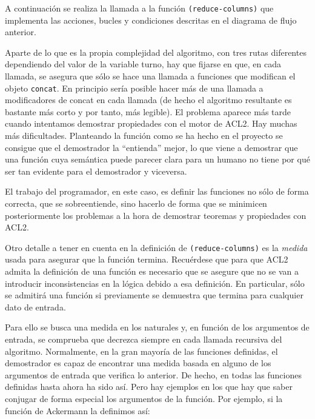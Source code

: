 \documentclass[a4paper,10pt]{article}
\begin{document}
\par \vspace{10pt}

A continuación se realiza la llamada a la función \texttt{(reduce-columns)} que implementa las acciones, bucles y condiciones descritas en el diagrama de flujo anterior. 

\par \vspace{10pt}

Aparte de lo que es la propia complejidad del algoritmo, con tres rutas diferentes dependiendo del valor de la variable turno, hay que fijarse en que, en cada llamada, se asegura que sólo se hace una llamada a funciones que modifican el objeto \texttt{concat}. En principio sería posible hacer más de una llamada a modificadores de concat en cada llamada (de hecho el algoritmo resultante es bastante más corto y por tanto, más legible). El problema aparece más tarde cuando intentamos demostrar propiedades con el motor de ACL2. Hay muchas más dificultades. Planteando la función como se ha hecho en el proyecto se consigue que el demostrador la ``entienda'' mejor, lo que viene a demostrar que una función cuya semántica puede parecer clara para un humano no tiene por qué ser tan evidente para el demostrador y viceversa. 

\par \vspace{10pt}

El trabajo del programador, en este caso, es definir las funciones no sólo de forma correcta, que se sobreentiende, sino hacerlo de forma que se minimicen posteriormente los problemas a la hora de demostrar teoremas y propiedades con ACL2.

\par \vspace{10pt}

Otro detalle a tener en cuenta en la definición de \texttt{(reduce-columns)} es la \emph{medida} usada para asegurar que la función termina. Recuérdese que para que ACL2 admita la definición de una función es necesario que se asegure que no se van a introducir inconsistencias en la lógica debido a esa definición. En particular, sólo se admitirá una función si previamente se demuestra que termina para cualquier dato de entrada.

\par \vspace{10pt}

Para ello se busca una medida en los naturales y, en función de los argumentos de entrada, se comprueba que decrezca siempre en cada llamada recursiva del algoritmo. Normalmente, en la gran mayoría de las funciones definidas, el demostrador es capaz de encontrar una medida basada en alguno de los argumentos de entrada que verifica lo anterior. De hecho, en todas las funciones definidas hasta ahora ha sido así. Pero hay ejemplos en los que hay que saber conjugar de forma especial los argumentos de la función. Por ejemplo, si la función de Ackermann la definimos así:
\end{document}
